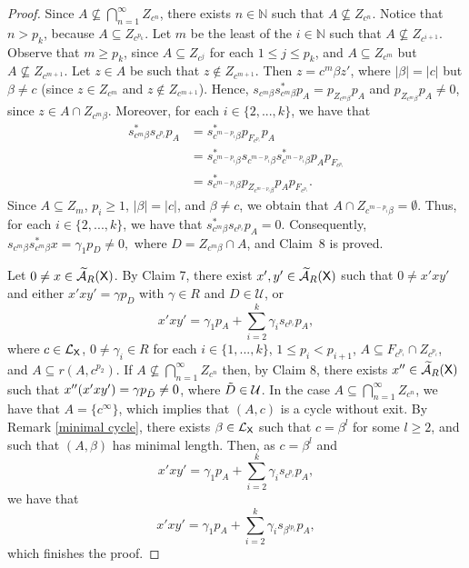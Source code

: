 \documentclass[a4paper,12pt]{amsart}
\theoremstyle{definition}
\theoremstyle{remark}
\numberwithin{equation}{section}
\newcommand{\osf}{{\normalfont \textsf{X}}}
\newcommand{\lang}{\CL_{\osf}}
\newcommand{\ualgshift}{\TCA_R(\osf)}
\newcommand{\N}{\mathbb{N}}
\newcommand{\CA}{\mathcal{A}}
\newcommand{\CL}{\mathcal{L}}
\newcommand{\TCA}{\widetilde{\CA}}
\newcommand{\TCB}{\mathcal{U}}
\begin{document}
\begin{proof}
Since $A\nsubseteq \bigcap\limits_{n=1}^\infty Z_{c^n}$, there exists $n\in \N$ such that $A\nsubseteq Z_{c^n}$. Notice that $n>p_k$, because $A\subseteq Z_{c^{p_k}}$. Let $m$ be the least of the $i\in \N$ such that $A\nsubseteq Z_{c^{i+1}}$. Observe that $m\geq p_k$, since $A\subseteq Z_{c^j}$ for each $1\leq j\leq p_k$, and $A\subseteq Z_{c^m}$ but $A\nsubseteq Z_{c^{m+1}}$. Let $z\in A$ be such that $z\notin Z_{c^{m+1}}$. Then $z=c^m\beta z'$, where $|\beta|=|c|$ but $\beta\neq c$ (since $z\in Z_{c^{m}}$ and $z\notin Z_{c^{m+1}}$).
Hence, $s_{c^m\beta} s_{c^m\beta}^*p_A=p_{Z_{c^m\beta}}p_A$
 and $p_{Z_{c^m\beta}}p_A\neq 0$, since $z\in A\cap Z_{c^m\beta}$.
Moreover, for each $i\in \{2,...,k\}$, we have that
\begin{align*}
s_{c^m\beta}^*s_{c^{p_i}}p_A&=s_{c^{m-p_i}\beta}^*p_{F_{c^{p_i}}}p_A\\
&=s_{c^{m-p_i}\beta}^*s_{c^{m-p_i}\beta}s_{c^{m-p_i}\beta}^*p_Ap_{F_{c^{p_i}}}\\
&=s_{c^{m-p_i}\beta}^*p_{Z_{c^{m-p_i}\beta}}p_Ap_{F_{c^{p_i}}}.
\end{align*}
Since $A\subseteq Z_m$, $p_i\geq 1$, $|\beta|=|c|$, and $\beta \neq c$, we obtain that $A\cap Z_{c^{m-p_i}\beta}=\emptyset$. Thus, for each $i\in \{2,...,k\}$, we have that
$s_{c^m\beta}^* s_{c^{p_i}}p_A=0$. Consequently, $s_{c^m\beta}s_{c^m\beta}^* x=\gamma_1 p_D\neq 0,$ where $D=Z_{c^m\beta}\cap A$, and Claim~8 is proved. 

\smallskip



Let $0\neq x\in \ualgshift$. By Claim 7, there exist $x',y'\in \ualgshift$ such that $0\neq x'xy'$ and  either $x'xy'=\gamma p_D$ with $\gamma \in R$ and $D\in \TCB$, or
$$x'xy'=\gamma_1 p_A+\sum\limits_{i=2}^k\gamma_i s_{c^{p_i}}p_A,$$ where $c\in \lang$, $0\neq \gamma_i\in R$ for each $i\in \{1,...,k\}$, $1\leq p_i <p_{i+1}$, $A\subseteq F_{c^{p_i}}\cap Z_{c^{p_i}}$, and  $A\subseteq r(A,c^{p_2})$.
If $A\nsubseteq \bigcap \limits_{n=1}^\infty Z_{c^n}$ then, by Claim 8, there exists $x''\in \ualgshift$ such that $x'' (x'xy')=\gamma p_{\Tilde{D}}\neq 0$, where $\Tilde{D}\in \TCB$. In the case $A\subseteq \bigcap\limits_{n=1}^\infty Z_{c^n}$, we have that $A=\{c^\infty\}$, which implies that $(A,c)$ is a cycle without exit. By Remark \ref{minimal cycle}, there exists $\beta\in \lang$ such that $c=\beta^l$ for some $l\geq 2$, and such that $(A,\beta)$ has minimal length. Then, as $c=\beta^l$ and $$x'xy'=\gamma_1 p_A+\sum\limits_{i=2}^k\gamma_i s_{c^{p_i}}p_A,$$ we have that 
$$x'xy'=\gamma_1 p_A+\sum\limits_{i=2}^k\gamma_i s_{\beta^{l p_i}}p_A,$$ which  finishes the proof.
\end{proof}
\end{document}
